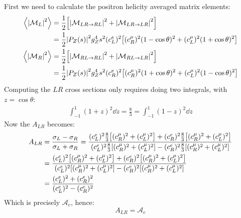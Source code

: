 \documentclass[12pt]{article}
\newcommand{\M}{\mathcal{M}}
\begin{document}
First we need to calculate the positron helicity averaged matrix elements:
\begin{align*}
  \ev{\abs{\M_L}^2}&=\frac12\qty[\abs{\M_{LR\to RL}}^2+\abs{\M_{LR\to LR}}^2]\\
  &=\frac12\abs{P_Z(s)}^2g_Z^4s^2(c_L^e)^2
  \qty[(c_R^\mu)^2(1-\cos\theta)^2+(c_L^\mu)^2(1+\cos\theta)^2]\\
  \ev{\abs{\M_R}^2}&=\frac12\qty[\abs{\M_{RL\to RL}}^2+\abs{\M_{RL\to LR}}^2]\\
  &=\frac12\abs{P_Z(s)}^2g_Z^4s^2(c_R^e)^2
  \qty[(c_R^\mu)^2(1+\cos\theta)^2+(c_L^\mu)^2(1-\cos\theta)^2]
\end{align*}
Computing the $LR$ cross sections only requires doing two integrals, with $z=\cos\theta$:
\begin{align*}
  \int_{-1}^1(1+z)^2\dd{z}=\frac83=\int_{-1}^1(1-z)^2\dd{z}
\end{align*}
Now the $A_{LR}$ becomes:
\begin{align*}
  A_{LR}&=\frac{\sigma_L-\sigma_R}{\sigma_L+\sigma_R}=
  \frac{(c^e_L)^2\frac83\qty[(c^\mu_R)^2+(c^\mu_L)^2]+
    (c^e_R)^2\frac83\qty[(c^\mu_R)^2+(c^\mu_L)^2]}{
    (c^e_L)^2\frac83\qty[(c^\mu_R)^2+(c^\mu_L)^2]-
    (c^e_R)^2\frac83\qty[(c^\mu_R)^2+(c^\mu_L)^2]
  }\\
  &=\frac{(c^e_L)^2\qty[(c^\mu_R)^2+(c^\mu_L)^2]+
    (c^e_R)^2\qty[(c^\mu_R)^2+(c^\mu_L)^2]}{
    (c^e_L)^2\qty[(c^\mu_R)^2+(c^\mu_L)^2]-
    (c^e_R)^2\qty[(c^\mu_R)^2+(c^\mu_L)^2]}\\
  &=\frac{(c^e_L)^2+(c^e_R)^2}{(c^e_L)^2-(c^e_R)^2}
\end{align*}
Which is precisely $\mathcal{A}_e$, hence:
\begin{equation}
  \label{eq:p6}
  \boxed{A_{LR}=\mathcal{A}_e}
\end{equation}
\end{document}
